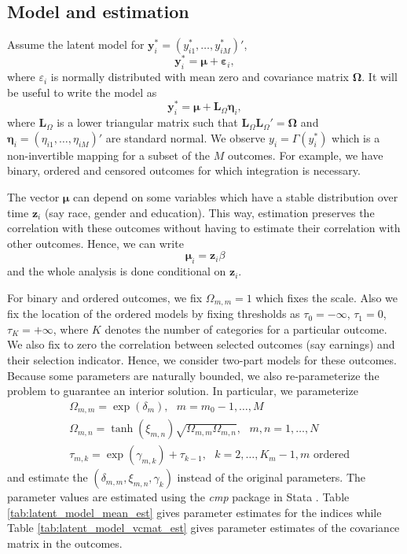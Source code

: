 \subsection{Model and estimation}
Assume the latent model for $\mathbf{y}^*_i = (y^*_{i1},\ldots,y^*_{iM})'$,
\[
\mathbf{y}^*_i = \mathbf{\mu} + \mathbf{\varepsilon} _i, 
\]
where $\varepsilon_i$ is normally distributed with mean zero and covariance matrix $\mathbf{\Omega}$. 
It will be useful to write the model as 
\[
\mathbf{y}^*_i = \mathbf{\mu} + \mathbf{L}_\Omega \mathbf{\eta}_i,
\]
where $\mathbf{L}_\Omega$ is a lower triangular matrix such that 
$\mathbf{L}_\Omega \mathbf{L}_\Omega' = \mathbf{\Omega}$ and $\mathbf{\eta}_i = (\eta_{i1},\ldots,\eta_{iM})'$ 
are standard normal. We observe $y_i = \Gamma(y^*_i)$ which is a non-invertible mapping for a subset 
of the $M$ outcomes. For example, we have binary, ordered and censored outcomes for which integration 
is necessary.

The vector $\mathbf{\mu}$ can depend on some variables which have a stable distribution over time $\mathbf{z}_i$ 
(say race, gender and education). This way, estimation preserves the correlation with these outcomes 
without having to estimate their correlation with other outcomes. Hence, we can write 
\[
\mathbf{\mu}_i = \mathbf{z}_i \beta
\]
and the whole analysis is done conditional on $\mathbf{z}_i$.

For binary and ordered outcomes, we fix $\Omega_{m,m}=1$ which fixes the scale. Also we fix the 
location of the ordered models by fixing thresholds as $\tau_0 = -\infty$, $\tau_1 = 0$, $\tau_K = +\infty$, 
where $K$ denotes the number of categories for a particular outcome. 
We also fix to zero the correlation between selected outcomes (say earnings) and 
their selection indicator. Hence, we consider two-part models for these outcomes. Because some parameters are 
naturally bounded, we also re-parameterize the problem to guarantee an interior solution. In particular, we parameterize 
\begin{align*}
&\Omega_{m,m} = \exp(\delta_m), \mbox{   } m=m_0-1,\ldots,M \\
&\Omega_{m,n} = \tanh(\xi_{m,n})\sqrt{\Omega_{m,m}\Omega_{m,n}}, \mbox{   } m,n=1,\ldots,N \\
&\tau_{m,k} = \exp(\gamma_{m,k}) + \tau_{k-1}, \mbox{   } k=2,\ldots,K_m-1, m \mbox{ ordered}
\end{align*}
and estimate the $(\delta_{m,m}, \xi_{m,n}, \gamma_k)$ instead of the original parameters. 
The parameter values are estimated using the \emph{cmp} package in Stata \citep{statacmp2011}.
Table \ref{tab:latent_model_mean_est} gives parameter estimates for the indices while Table \ref{tab:latent_model_vcmat_est} 
gives parameter estimates of the covariance matrix in the outcomes.


